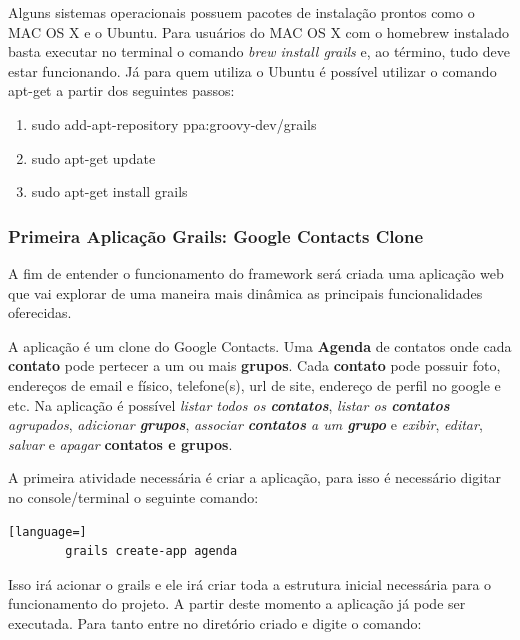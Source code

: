 \documentclass[12pt]{article}
\begin{document}
    Alguns sistemas operacionais possuem pacotes de instalação prontos como o MAC
    OS X e o Ubuntu. Para usuários do MAC OS X com o homebrew instalado basta executar
    no terminal o comando \emph{brew install grails} e, ao término, tudo deve 
    estar funcionando. Já para quem utiliza o Ubuntu é possível utilizar o comando 
    apt-get a partir dos seguintes passos:
    
    \begin{enumerate}
        \item sudo add-apt-repository ppa:groovy-dev/grails
        \item sudo apt-get update
        \item sudo apt-get install grails
    \end{enumerate}

\subsubsection{Primeira Aplicação Grails: Google Contacts Clone}

    A fim de entender o funcionamento do framework será criada uma aplicação web
    que vai explorar de uma maneira mais dinâmica as principais funcionalidades
    oferecidas.
    
    A aplicação é um clone do Google Contacts. Uma \textbf{Agenda} de contatos onde cada 
    \textbf{contato} pode pertecer a um ou mais \textbf{grupos}. Cada \textbf{contato}
    pode possuir foto, endereços de email e físico, telefone(s), url de site, endereço 
    de perfil no google e etc. Na aplicação é possível \emph{listar todos os 
    \textbf{contatos}}, \emph{listar os \textbf{contatos} agrupados}, 
    \emph{adicionar \textbf{grupos}}, \emph{associar \textbf{contatos} a um \textbf{grupo}}
    e \emph{exibir}, \emph{editar}, \emph{salvar} e \emph{apagar} \textbf{contatos e grupos}.
    
    A primeira atividade necessária é criar a aplicação, para isso é necessário
    digitar no console/terminal o seguinte comando:
    
    \begin{lstlisting}[language=]
        grails create-app agenda
    \end{lstlisting}
    
    Isso irá acionar o grails e ele irá criar toda a estrutura inicial necessária para
    o funcionamento do projeto. A partir deste momento a aplicação já pode ser 
    executada. Para tanto entre no diretório criado e digite o comando:
    
\end{document}
